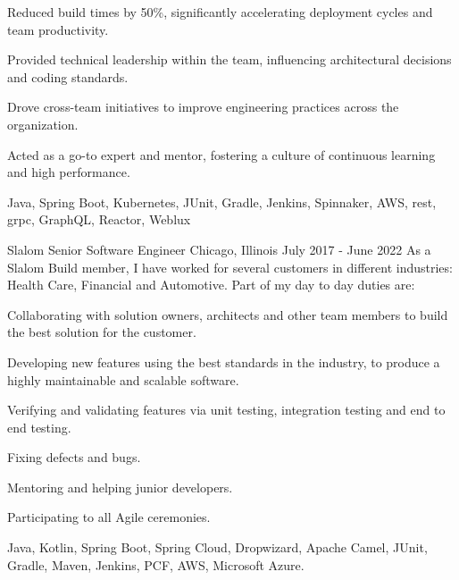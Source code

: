 \begin{cventries}
{\begin{cvitems}
		\item {Reduced build times by 50\%, significantly accelerating deployment cycles and team productivity.}
		\item {Provided technical leadership within the team, influencing architectural decisions and coding standards.}
		\item {Drove cross-team initiatives to improve engineering practices across the organization.}
		\item {Acted as a go-to expert and mentor, fostering a culture of continuous learning and high performance.}
      \end{cvitems}
    }
    {Java, Spring Boot, Kubernetes, JUnit, Gradle, Jenkins, Spinnaker, AWS, rest, grpc, GraphQL, Reactor, Weblux}

  \experienceentry
  {Slalom} %
    {Senior Software Engineer} %
    {Chicago, Illinois} %
    {July 2017 - June 2022} %
    {As a Slalom Build member, I have worked for several customers in different industries: Health Care, Financial and Automotive. Part of my day to day duties are:}
    {
      \begin{cvitems} %
      	\item {Collaborating with solution owners, architects and other team members to build the best solution for the customer.}
      	\item {Developing new features using the best standards in the industry, to produce a highly maintainable and scalable software.}
      	\item {Verifying and validating features via unit testing, integration testing and end to end testing.}
      	\item {Fixing defects and bugs.}
      	\item {Mentoring and helping junior developers.}
        \item {Participating to all Agile ceremonies.}
      \end{cvitems}
    }
    {Java, Kotlin, Spring Boot, Spring Cloud, Dropwizard, Apache Camel, JUnit, Gradle, Maven, Jenkins, PCF, AWS, Microsoft Azure.}
  

\end{cventries}

